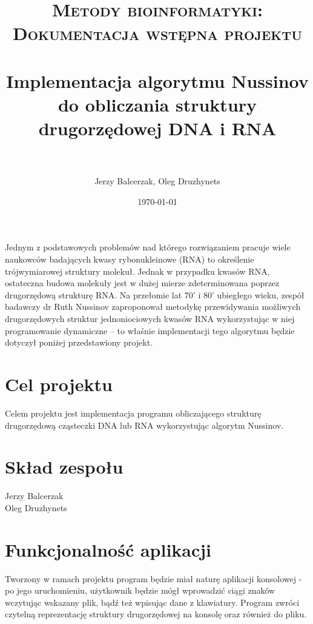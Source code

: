 \documentclass[paper=a4, fontsize=11pt]{scrartcl} %
\title{	
\normalfont \normalsize 
\textsc{Metody bioinformatyki: Dokumentacja wstępna projektu} \\ [25pt] %
\horrule{0.5pt} \\[0.4cm] %
\huge Implementacja algorytmu Nussinov do obliczania struktury drugorzędowej DNA i RNA \\ %
\horrule{2pt} \\[0.5cm] %
}
\author{Jerzy Balcerzak,
Oleg Druzhynets} %
\date{\normalsize\today} %
\numberwithin{equation}{section} %
\numberwithin{figure}{section} %
\numberwithin{table}{section} %
\begin{document}
\maketitle %


Jednym z podstawowych problemów nad którego rozwiązaniem pracuje wiele naukowców badających kwasy rybonukleinowe (RNA) to określenie trójwymiarowej struktury molekuł. Jednak w przypadku kwasów RNA, ostateczna budowa molekuły jest w dużej mierze zdeterminowana poprzez drugorzędową strukturę RNA. Na przełomie lat 70' i 80' ubiegłego wieku, zespół badawczy dr Ruth Nussinov zaproponował metodykę przewidywania możliwych drugorzędowych struktur jednoniociowych kwasów RNA \cite{bib:nuss1}\cite{bib:nuss2} wykorzystując w niej programowanie dynamiczne – to właśnie implementacji tego algorytmu będzie dotyczył poniżej przedstawiony projekt.

\section{Cel projektu}

	Celem projektu jest implementacja programu obliczającego strukturę drugorzędową cząsteczki DNA lub RNA wykorzystując algorytm Nussinov.


\section{Skład zespołu}

	Jerzy Balcerzak \\
	Oleg Druzhynets 

\section{Funkcjonalność aplikacji}

Tworzony w ramach projektu program będzie miał naturę aplikacji konsolowej - po jego uruchomieniu, użytkownik będzie mógł wprowadzić ciągi znaków wczytując wskazany plik, bądź też wpisując dane z klawiatury. 
Program zwróci czytelną reprezentację struktury drugorzędowej na konsolę oraz również do pliku.
\end{document}
